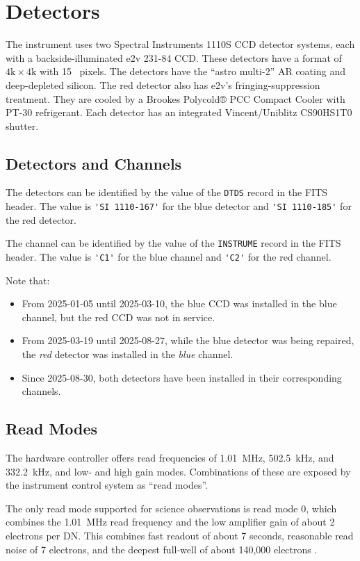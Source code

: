 \chapter{Detectors}

The instrument uses two Spectral Instruments 1110S CCD detector systems, each with a backside-illuminated e2v 231-84 CCD. These detectors have a format of $4\mathrm{k}\times4\mathrm{k}$ with 15~{\micron} pixels. The detectors have the “astro multi-2” AR coating and deep-depleted silicon. The red detector also has e2v's fringing-suppression treatment. They are cooled by a Brookes Polycold® PCC Compact Cooler with PT-30 refrigerant. Each detector has an integrated Vincent/Uniblitz CS90HS1T0 shutter.

\section{Detectors and Channels}

The detectors can be identified by the value of the \verb|DTDS| record in the FITS header. The value is \verb|'SI 1110-167'| for the blue detector and \verb|'SI 1110-185'| for the red detector.

The channel can be identified by the value of the \verb|INSTRUME| record in the FITS header. The value is \verb|'C1'| for the blue channel and \verb|'C2'| for the red channel.

Note that:
\begin{itemize}
  \item From 2025-01-05 until 2025-03-10, the blue CCD was installed in the blue channel, but the red CCD was not in service.
  \item From 2025-03-19 until 2025-08-27,  while the blue detector was being repaired, the \emph{red} detector was installed in the \emph{blue} channel.
  \item Since 2025-08-30, both detectors have been installed in their corresponding channels.
\end{itemize}

\section{Read Modes}

The hardware controller offers read frequencies of 1.01~MHz, 502.5~kHz, and 332.2~kHz, and low- and high gain modes. Combinations of these are exposed by the instrument control system as “read modes”. 

The only read mode supported for science observations is read mode 0, which combines the  1.01~MHz read frequency and the low amplifier gain of about 2 electrons per DN. This combines fast readout of about 7 seconds, reasonable read noise of 7 electrons, and the deepest full-well of about 140,000 electrons \citep{laboratory}. 

